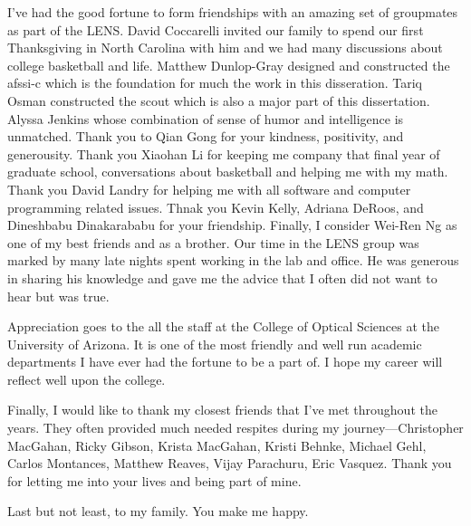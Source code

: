 I've had the good fortune to form friendships with an amazing set of groupmates as part of the \gls{LENS}. David Coccarelli invited our family to spend our first Thanksgiving in North Carolina with him and we had many discussions about college basketball and life. Matthew Dunlop-Gray designed and constructed the \gls{afssi-c} which is the foundation for much the work in this disseration. Tariq Osman constructed the \gls{scout} which is also a major part of this dissertation. Alyssa Jenkins whose combination of sense of humor and intelligence is unmatched. Thank you to Qian Gong for your kindness, positivity, and generousity. Thank you Xiaohan Li for keeping me company that final year of graduate school, conversations about basketball and helping me with my math. Thank you David Landry for helping me with all software and computer programming related issues. Thnak you Kevin Kelly, Adriana DeRoos, and Dineshbabu Dinakarababu for your friendship. Finally, I consider Wei-Ren Ng as one of my best friends and as a brother. Our time in the \gls{LENS} group was marked by many late nights spent working in the lab and office. He was generous in sharing his knowledge and gave me the advice that I often did not want to hear but was true. 

Appreciation goes to the all the staff at the College of Optical Sciences at the University of Arizona. It is one of the most friendly and well run academic departments I have ever had the fortune to be a part of. I hope my career will reflect well upon the college. 

Finally, I would like to thank my closest friends that I've met throughout the years. They often provided much needed respites during my journey---Christopher MacGahan, Ricky Gibson, Krista MacGahan, Kristi Behnke, Michael Gehl, Carlos Montances, Matthew Reaves, Vijay Parachuru, Eric Vasquez. Thank you for letting me into your lives and being part of mine.

Last but not least, to my family. You make me happy. 